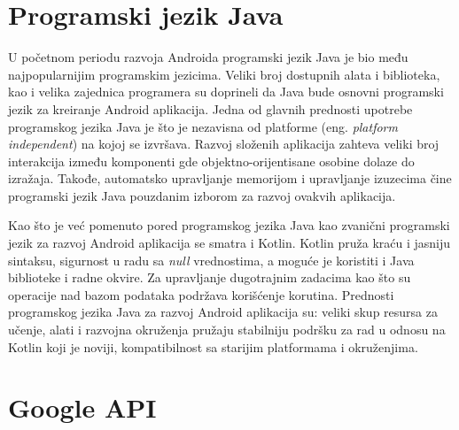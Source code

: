 \documentclass[../TamaraIvanovicMasterRad.tex]{subfiles}
\begin{document}
\section{Programski jezik Java}
U početnom periodu razvoja Androida programski jezik Java je bio među najpopularnijim programskim jezicima. Veliki broj dostupnih alata i biblioteka, kao i velika zajednica programera su doprineli da Java bude osnovni programski jezik za kreiranje Android aplikacija. Jedna od glavnih prednosti upotrebe programskog jezika Java je što je nezavisna od platforme (eng. \textit{platform independent}) na kojoj se izvršava. Razvoj složenih aplikacija zahteva veliki broj interakcija između komponenti gde objektno-orijentisane osobine dolaze do izražaja. Takođe, automatsko upravljanje memorijom i upravljanje izuzecima čine programski jezik Java pouzdanim izborom za razvoj ovakvih aplikacija. 

Kao što je već pomenuto pored programskog jezika Java kao zvanični programski jezik za razvoj Android aplikacija se smatra i Kotlin. Kotlin pruža kraću i jasniju sintaksu, sigurnost u radu sa \textit{null} vrednostima, a moguće je koristiti i Java biblioteke i radne okvire. Za upravljanje dugotrajnim zadacima kao što su operacije nad bazom podataka podržava korišćenje korutina. Prednosti programskog jezika Java za razvoj Android aplikacija su: veliki skup resursa za učenje, alati i razvojna okruženja pružaju stabilniju podršku za rad u odnosu na Kotlin koji je noviji, kompatibilnost sa starijim platformama i okruženjima.


\section{Google API}\label{sec:google}

\end{document}
